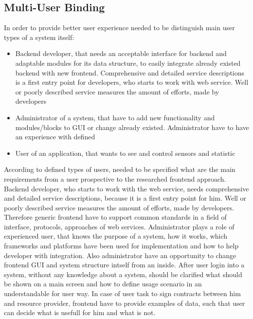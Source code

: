 \subsection {Multi-User Binding}
	In order to provide better user experience needed to be distinguish main user types of a system itself:
	\begin{itemize}
	\item Backend developer, that needs an acceptable interface for backend and adaptable modules for its data structure, to easily 
	      integrate already existed backend with new frontend. Comprehensive and detailed service descriptions is a first entry point for developers, who starts to work with web service. Well or poorly described service measures the amount of efforts, made by developers
	\item Administrator of a system, that have to add new functionality and modules/blocks to GUI or change already existed.     
	      Administrator have to have an experience with defined 
	\item User of an application, that wants to see and control sensors and statistic
	\end{itemize}
	According to defined types of users, needed to be specified what are the main requirements from a user prospective to the researched frontend approach.
	\newline 
	Backend developer, who starts to work with the web service, needs comprehensive and detailed service descriptions, because it is a first entry point for him. Well or poorly described service measures the amount of efforts, made by developers. Therefore generic frontend have to support common standards in a field of interface, protocols, approaches of web services.
	\newline
	Administrator plays a role of experienced user, that knows the purpose of a system, how it works, which frameworks and platforms have been used for implementation and how to help developer with integration. Also administrator have an opportunity to change frontend GUI and system structure intself from an inside.
	\newline
	After user login into a system, without any knowledge about a system, should be clarified what should be shown on a main screen and how to define usage scenario in an understandable for user way. In case of user task to sign contracts between him and resource provider, frontend have to provide examples of data, such that user can decide what is usefull for him and what is not.

